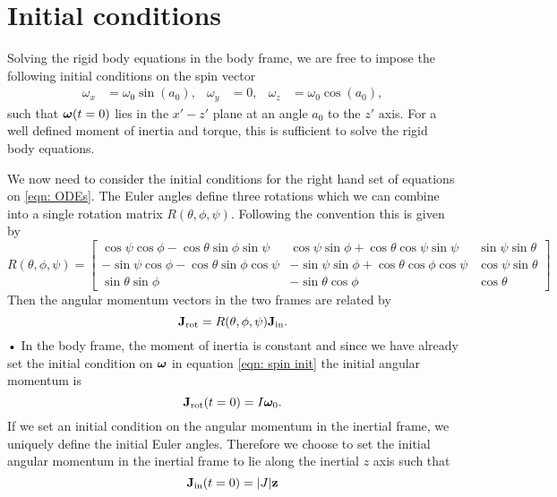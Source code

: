 \documentclass[../full_thesis/full_thesis.tex]{subfiles}
\begin{document}
\section{Initial conditions}

Solving the rigid body equations in the body frame, we are free to impose the
following initial conditions on the spin vector
\begin{align}\label{eqn: spin init}
\omega_{x} & = \omega_{0}\sin(a_{0}), &
\omega_{y} & = 0, &
\omega_{z} & = \omega_{0}\cos(a_{0}),
\end{align}
such that $\boldsymbol{\omega}(t=0)$ lies in the $x' - z'$ plane at an angle $a_{0}$ to the
$z'$ axis. For a well defined moment of
inertia and torque, this is sufficient to solve the rigid body equations.

We now need to consider the initial conditions for the right hand set of equations
on \eqref{eqn: ODEs}. The Euler angles  define three rotations which we can
combine into a single rotation matrix $R(\theta, \phi, \psi)$. Following the
\citet{Landau1969} convention this is given by
\begin{equation}
R(\theta, \phi, \psi) = \left[
\begin{array}{ccc}
\cos\psi \cos\phi - \cos\theta \sin\phi \sin \psi &
\cos\psi \sin \phi + \cos\theta \cos \psi \sin \psi &
\sin \psi \sin\theta \\
-\sin\psi \cos\phi - \cos\theta\sin\phi\cos\psi &
-\sin\psi\sin\phi + \cos\theta\cos\phi\cos\psi &
\cos\psi \sin\theta \\
\sin\theta\sin\phi &
-\sin\theta \cos\phi &
\cos\theta
\end{array}
\right]
\label{eqn: rotation matrix}
\end{equation}
Then the
angular momentum vectors in the two frames are related by
\begin{equation}
\mathbf{J}_{\textrm{rot}} = R(\theta, \phi, \psi) \mathbf{J}_{\textrm{in}} .
\label{eqn: transform}
\end{equation}•
In the body frame, the moment of inertia is constant and since we have already set the
initial condition on $\boldsymbol{\omega}$  in equation \eqref{eqn: spin init} the initial angular momentum is
\begin{equation}
  \mathbf{J}_{\textrm{rot}}(t=0) = I \boldsymbol{\omega}_0.
\end{equation}
If we set an initial condition on the angular momentum in the inertial frame,
we uniquely define the initial Euler angles. Therefore we choose to set the initial
angular momentum in the inertial frame to lie along the inertial $z$ axis such
that
\begin{equation}
  \mathbf{J}_{\textrm{in}}(t=0) = |J| \mathbf{z}
\end{equation}
\end{document}
